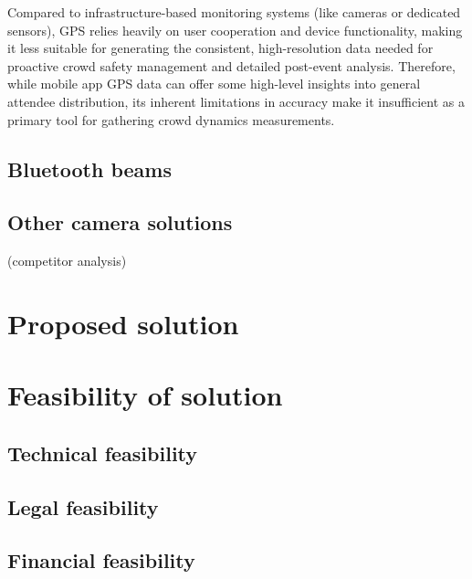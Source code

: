 Compared to infrastructure-based monitoring systems (like cameras or dedicated sensors), GPS relies heavily on user cooperation and device functionality, making it less suitable for generating the consistent, high-resolution data needed for proactive crowd safety management and detailed post-event analysis. Therefore, while mobile app GPS data can offer some high-level insights into general attendee distribution, its inherent limitations in accuracy make it insufficient as a primary tool for gathering crowd dynamics measurements.

\subsection{Bluetooth beams}
\subsection{Other camera solutions}
(competitor analysis)

\section{Proposed solution}
\label{sec:solution}

\section{Feasibility of solution}
\label{sec:feasibility}
\subsection{Technical feasibility}
\subsection{Legal feasibility}
\subsection{Financial feasibility}


